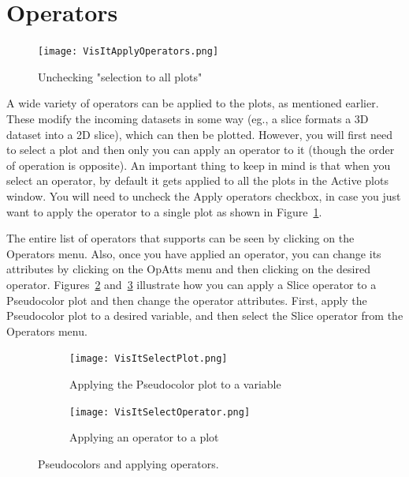 \section{Operators}
\begin{figure}
  \vspace{-20pt}
  \centering
  \texttt{[image: VisItApplyOperators.png]}
  \vspace{-10pt}
  \caption{Unchecking "selection to all plots"}
  \label{VisItApplyOperators}
\end{figure}

A wide variety of operators can be applied to the plots, as mentioned
earlier. These modify the incoming datasets in some way (eg., a slice
formats a 3D dataset into a 2D slice), which can then be
plotted. However, you will first need to select a plot and then only
you can apply an operator to it (though the order of operation is
opposite). An important thing to keep in mind is that when you select
an operator, by default it gets applied to all the plots in the Active
plots window. You will need to uncheck the Apply operators checkbox,
in case you just want to apply the operator to a single plot as shown
in Figure~\ref{VisItApplyOperators}.

The entire list of operators that \Visit supports can be seen by
clicking on the Operators menu. Also, once you have applied an
operator, you can change its attributes by clicking on the OpAtts menu
and then clicking on the desired operator.
Figures~\ref{VisItSelectPlot} and~\ref{VisItSelectOperator} illustrate
how you can apply a Slice operator to a Pseudocolor plot and then
change the operator attributes.  First, apply the Pseudocolor plot to
a desired variable, and then select the Slice operator from the
Operators menu.
\begin{figure}[htbp!]
  \begin{subfigure}[b]{0.5\textwidth}
    \centering 
    \texttt{[image: VisItSelectPlot.png]}
    \caption{Applying the Pseudocolor plot to a variable}
    \label{VisItSelectPlot}
  \end{subfigure}
  \begin{subfigure}[b]{0.5\textwidth}
    \centering 
    \texttt{[image: VisItSelectOperator.png]}
    \caption{Applying an operator to a plot}
    \label{VisItSelectOperator}
  \end{subfigure}
  \caption{Pseudocolors and applying operators.}
  \label{ucf:fig1}
\end{figure}

